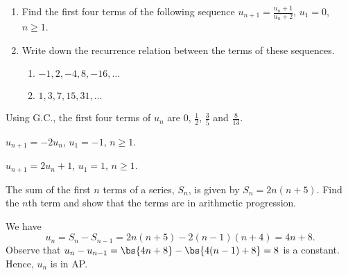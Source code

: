 \begin{problem}
    \begin{enumerate}
        \item Find the first four terms of the following sequence $u_{n+1} = \frac{u_n + 1}{u_n + 2}$, $u_1 = 0$, $n \geq 1$.
        \item Write down the recurrence relation between the terms of these sequences.
        \begin{enumerate}
            \item $-1, 2, -4, 8, -16, \ldots$
            \item $1, 3, 7, 15, 31, \ldots$
        \end{enumerate}
    \end{enumerate}
\end{problem}
\begin{solution}
    \begin{ppart}
        Using G.C., the first four terms of $u_n$ are 0, $\frac12$, $\frac35$ and $\frac8{13}$. 
    \end{ppart}
    \begin{ppart}
        \begin{psubpart}
            $u_{n+1} = -2u_n$, $u_1 = -1$, $n \geq 1$.
        \end{psubpart}
        \begin{psubpart}
            $u_{n+1} = 2u_n + 1$, $u_1 = 1$, $n \geq 1$.
        \end{psubpart}
    \end{ppart}
\end{solution}

\begin{problem}
    The sum of the first $n$ terms of a series, $S_n$, is given by $S_n = 2n(n+5)$. Find the $n$th term and show that the terms are in arithmetic progression.
\end{problem}
\begin{solution}
    We have \[u_n = S_n - S_{n-1} = 2n(n+5) - 2(n-1)(n+4) = 4n + 8.\] Observe that $u_n - u_{n-1} = \bs{4n + 8} - \bs{4(n-1) + 8} = 8$ is a constant.  Hence, $u_n$ is in AP.
\end{solution}

